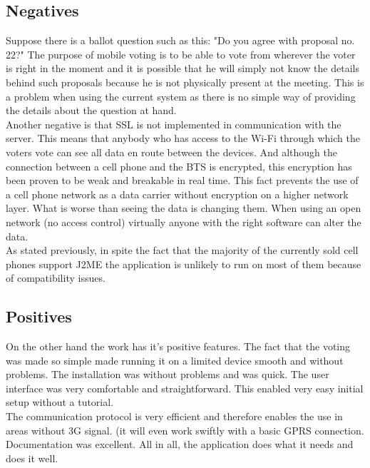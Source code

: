 \documentclass[11pt,twoside,a4paper]{book}
\begin{document}
\subsection{Negatives}
Suppose there is a ballot question such as this: "Do you agree with proposal no. 22?" The purpose of mobile voting is to be able to vote from wherever the voter is right in the moment and it is possible that he will simply not know the details behind such proposals because he is not physically present at the meeting. This is a problem when using the current system as there is no simple way of providing the details about the question at hand.\\
Another negative is that SSL is not implemented in communication with the server. This means that anybody who has access to the Wi-Fi through which the voters vote can see all data en route between the devices. And although the connection between a cell phone and the BTS\cite{whatISBTS}  is encrypted, this encryption has been proven to be weak\cite{GSMCypherWeakness} and breakable in real time. This fact  prevents the use of a cell phone network as a data carrier without encryption on a higher network layer. What is worse than seeing the data is changing them. When using an open network (no access control) virtually anyone with the right software can alter the data.\\
As stated previously, in spite the fact that the majority of the currently sold cell phones support J2ME the application is unlikely to run on most of them because of compatibility issues.\cite{bakalarkaJV}

\subsection{Positives}
On the other hand the work has it's positive features. The fact that the voting was made so simple made running it on a limited device smooth and without problems. The installation was without problems and was quick. The user interface was very comfortable and straightforward. This enabled very easy initial setup without a tutorial.\\
The communication protocol is very efficient and therefore enables the use in areas without 3G signal. (it will even work swiftly with a basic GPRS connection. Documentation was excellent. All in all, the application does what it needs and does it well.
\end{document}
